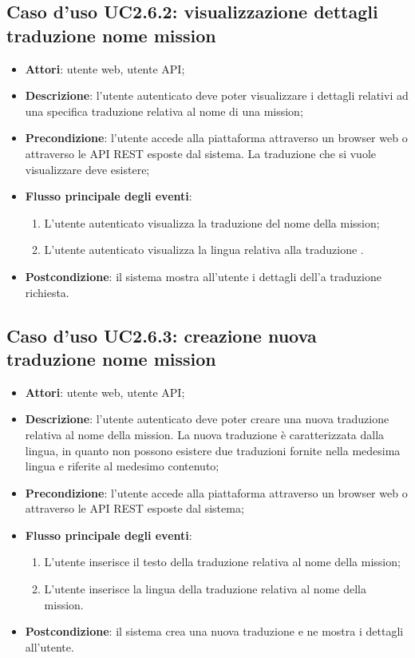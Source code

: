 \hypertarget{UC2.6.2}{}
\subsection{Caso d'uso UC2.6.2: visualizzazione dettagli traduzione nome mission}
\begin{itemize}
\item \textbf{Attori}: utente web, utente API;
\item \textbf{Descrizione}: l'utente autenticato deve poter visualizzare i dettagli relativi ad una specifica traduzione relativa al nome di una mission; 
      \item \textbf{Precondizione}: l'utente accede alla piattaforma attraverso un browser web o attraverso le API REST esposte dal sistema. La traduzione che si vuole visualizzare deve esistere;

        \item \textbf{Flusso principale degli eventi}:
          \begin{enumerate}
          \item L'utente autenticato visualizza la traduzione del nome della mission;
          \item L'utente autenticato visualizza la lingua relativa alla traduzione .

      \end{enumerate}
    \item \textbf{Postcondizione}: il sistema mostra all'utente i dettagli dell'a traduzione richiesta.
  \end{itemize}
\hypertarget{UC2.6.3}{}
\subsection{Caso d'uso UC2.6.3: creazione nuova traduzione nome mission}
\begin{itemize}
\item \textbf{Attori}: utente web, utente API;
\item \textbf{Descrizione}: l'utente autenticato deve poter creare una nuova traduzione relativa al nome della mission. La nuova traduzione è caratterizzata dalla lingua, in quanto non possono esistere due traduzioni fornite nella medesima lingua e riferite al medesimo contenuto; 
      \item \textbf{Precondizione}: l'utente accede alla piattaforma attraverso un browser web o attraverso le API REST esposte dal sistema;

        \item \textbf{Flusso principale degli eventi}:
          \begin{enumerate}
          \item L'utente inserisce il testo della traduzione relativa al nome della mission;
          \item L'utente inserisce la lingua della traduzione relativa al nome della mission.

      \end{enumerate}
    \item \textbf{Postcondizione}: il sistema crea una nuova traduzione e ne mostra i dettagli all'utente.
  \end{itemize}
\hypertarget{UC2.6.4}{}
